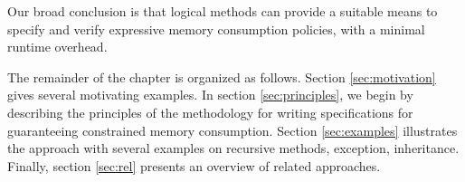 Our broad conclusion is that logical methods can provide a suitable means
to specify and verify expressive memory consumption policies, with a
minimal runtime overhead.

The remainder of the chapter is organized as follows. 
Section \ref{sec:motivation} gives several motivating examples.
In section \ref{sec:principles},  we begin by describing the principles of
 the methodology for writing specifications for guaranteeing constrained memory consumption.
Section \ref{sec:examples} illustrates the approach with several examples on recursive methods, exception, inheritance.
Finally, section \ref{sec:rel} presents an overview of related approaches.
